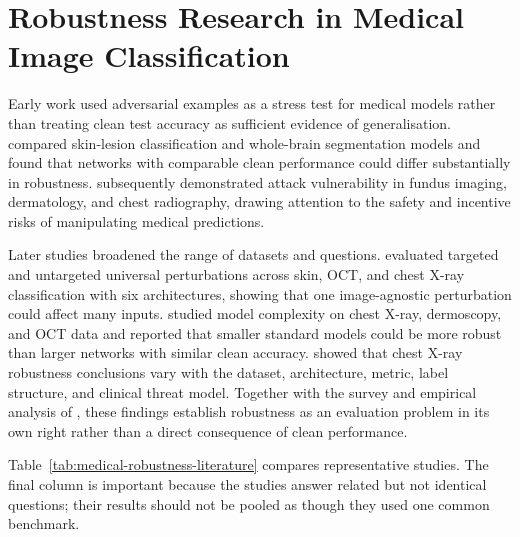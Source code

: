 \documentclass[12pt,a4paper,oneside]{report}
\begin{document}
\section{Robustness Research in Medical Image Classification}
\label{sec:rw-medical-robust}


Early work used adversarial examples as a stress test for medical models rather than treating clean test accuracy as sufficient evidence of generalisation. \citet{paschali2018generalizability} compared skin-lesion classification and whole-brain segmentation models and found that networks with comparable clean performance could differ substantially in robustness. \citet{finlayson2019adversarial} subsequently demonstrated attack vulnerability in fundus imaging, dermatology, and chest radiography, drawing attention to the safety and incentive risks of manipulating medical predictions.

Later studies broadened the range of datasets and questions. \citet{hirano2021universal} evaluated targeted and untargeted universal perturbations across skin, OCT, and chest X-ray classification with six architectures, showing that one image-agnostic perturbation could affect many inputs. \citet{rodriguez2022complexity} studied model complexity on chest X-ray, dermoscopy, and OCT data and reported that smaller standard models could be more robust than larger networks with similar clean accuracy. \citet{ghamizi2023evaluating} showed that chest X-ray robustness conclusions vary with the dataset, architecture, metric, label structure, and clinical threat model. Together with the survey and empirical analysis of \citet{ma2021understanding}, these findings establish robustness as an evaluation problem in its own right rather than a direct consequence of clean performance.

Table~\ref{tab:medical-robustness-literature} compares representative studies. The final column is important because the studies answer related but not identical questions; their results should not be pooled as though they used one common benchmark.
\end{document}
